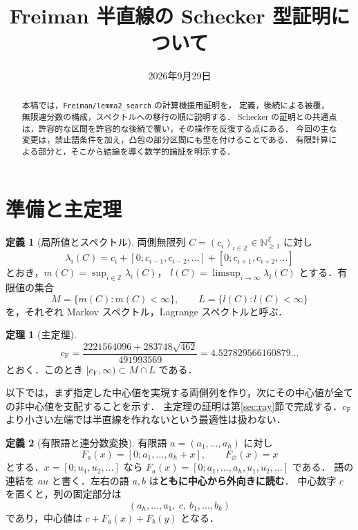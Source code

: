 \documentclass[10pt,a4paper]{article}
\title{Freiman 半直線の Schecker 型証明について}
\author{}
\date{2026年9月29日}
\theoremstyle{definition}
\newtheorem{definition}{定義}
\newtheorem{theorem}{定理}
\newcommand{\CF}{c_{\mathrm F}}
\newcommand{\eps}{\varnothing}
\newcommand{\file}[1]{{\small\nolinkurl{#1}}}
\begin{document}
\maketitle
\begin{abstract}
本稿では，\file{Freiman/lemma2_search} の計算機援用証明を，
定義，後続による被覆，無限連分数の構成，スペクトルへの移行の順に説明する．
Schecker の証明との共通点は，許容的な区間を許容的な後続で覆い，その操作を反復する点にある．
今回の主な変更は，禁止語条件を加え，凸包の部分区間にも型を付けることである．
有限計算による部分と，そこから結論を導く数学的論証を明示する．
\end{abstract}

\section{準備と主定理}
\begin{definition}[局所値とスペクトル]\label{def:spectra}
両側無限列 $C=(c_i)_{i\in\mathbb Z}\in\mathbb N_{\ge1}^{\mathbb Z}$ に対し
\[
 \lambda_i(C)=c_i+[0;c_{i-1},c_{i-2},\ldots]+[0;c_{i+1},c_{i+2},\ldots]
\]
とおき，$m(C)=\sup_{i\in\mathbb Z}\lambda_i(C)$，
$l(C)=\limsup_{i\to\infty}\lambda_i(C)$ とする．有限値の集合
\[
 M=\{m(C):m(C)<\infty\},\qquad L=\{l(C):l(C)<\infty\}
\]
を，それぞれ Markov スペクトル，Lagrange スペクトルと呼ぶ．
\end{definition}

\begin{theorem}[主定理]\label{thm:main}
\[
 \CF=\frac{2221564096+283748\sqrt{462}}{491993569}
      =4.527829566160879\ldots
\]
とおく．このとき $[\CF,\infty)\subset M\cap L$ である．
\end{theorem}

以下では，まず指定した中心値を実現する両側列を作り，次にその中心値が全ての非中心値を支配することを示す．
主定理の証明は第\ref{sec:ray}節で完成する．$\CF$ より小さい左端では半直線を作れないという最適性は扱わない．

\begin{definition}[有限語と連分数変換]\label{def:word}
有限語 $a=(a_1,\ldots,a_h)$ に対し
\[
 F_a(x)=[0;a_1,\ldots,a_h+x],\qquad F_\eps(x)=x
\]
とする．$x=[0;u_1,u_2,\ldots]$ なら
$F_a(x)=[0;a_1,\ldots,a_h,u_1,u_2,\ldots]$ である．
語の連結を $au$ と書く．左右の語 $a,b$ は\textbf{ともに中心から外向きに読む}．
中心数字 $c$ を置くと，列の固定部分は
\[
 (a_h,\ldots,a_1,\ c,\ b_1,\ldots,b_k)
\]
であり，中心値は $c+F_a(x)+F_b(y)$ となる．
\end{definition}
\end{document}
